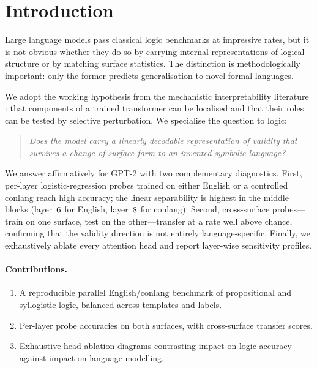 \section{Introduction}

Large language models pass classical logic benchmarks at impressive rates,
but it is not obvious whether they do so by carrying internal representations
of logical structure or by matching surface statistics. The distinction is
methodologically important: only the former predicts generalisation to novel
formal languages.

We adopt the working hypothesis from the mechanistic interpretability
literature \cite{wang2022interpret,nanda2023progress}: that components of a
trained transformer can be localised and that their roles can be tested by
selective perturbation. We specialise the question to logic:

\begin{quote}
\emph{Does the model carry a linearly decodable representation of validity
that survives a change of surface form to an invented symbolic language?}
\end{quote}

We answer affirmatively for GPT-2 with two complementary diagnostics. First,
per-layer logistic-regression probes trained on either English or a
controlled conlang reach high accuracy; the linear separability is highest
in the middle blocks (layer~$6$ for English,
layer~$8$ for conlang). Second, cross-surface
probes---train on one surface, test on the other---transfer at a rate well
above chance, confirming that the validity direction is not entirely
language-specific. Finally, we exhaustively ablate every attention head and
report layer-wise sensitivity profiles.

\paragraph{Contributions.}
\begin{enumerate}
\item A reproducible parallel English/conlang benchmark of propositional
and syllogistic logic, balanced across templates and labels.
\item Per-layer probe accuracies on both surfaces, with cross-surface
transfer scores.
\item Exhaustive head-ablation diagrams contrasting impact on logic
accuracy against impact on language modelling.
\end{enumerate}
